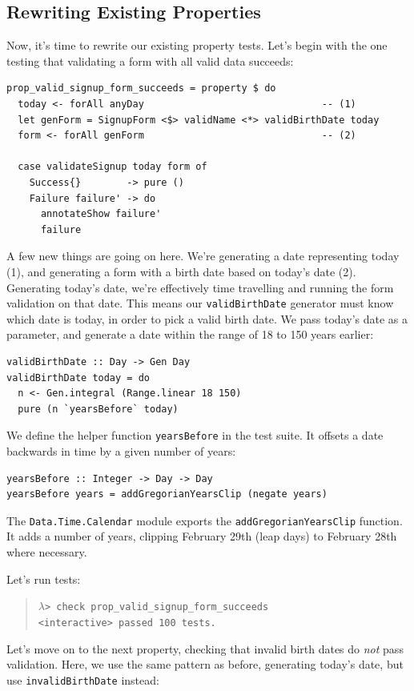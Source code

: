 \subsection{Rewriting Existing
Properties}\label{rewriting-existing-properties}

Now, it's time to rewrite our existing property tests. Let's begin with
the one testing that validating a form with all valid data succeeds:

\begin{verbatim}
prop_valid_signup_form_succeeds = property $ do
  today <- forAll anyDay                               -- (1)
  let genForm = SignupForm <$> validName <*> validBirthDate today
  form <- forAll genForm                               -- (2)

  case validateSignup today form of
    Success{}        -> pure ()
    Failure failure' -> do
      annotateShow failure'
      failure
\end{verbatim}
A few new things are going on here. We're generating a date representing
today (1), and generating a form with a birth date based on today's date
(2). Generating today's date, we're effectively time travelling and
running the form validation on that date. This means our
\texttt{validBirthDate} generator must know which date is today, in
order to pick a valid birth date. We pass today's date as a parameter,
and generate a date within the range of 18 to 150 years earlier:

\begin{verbatim}
validBirthDate :: Day -> Gen Day
validBirthDate today = do
  n <- Gen.integral (Range.linear 18 150)
  pure (n `yearsBefore` today)
\end{verbatim}
We define the helper function \texttt{yearsBefore} in the test suite. It
offsets a date backwards in time by a given number of years:

\begin{verbatim}
yearsBefore :: Integer -> Day -> Day
yearsBefore years = addGregorianYearsClip (negate years)
\end{verbatim}
The \texttt{Data.Time.Calendar} module exports the
\texttt{addGregorianYearsClip} function. It adds a number of years,
clipping February 29th (leap days) to February 28th where necessary.

Let's run tests:

\begin{quote}
$\lambda$\verb|> check prop_valid_signup_form_succeeds| \\
  \hspace*{1cm}\checkmark \verb|<interactive> passed 100 tests.|
\end{quote}
Let's move on to the next property, checking that invalid birth dates do
\emph{not} pass validation. Here, we use the same pattern as before,
generating today's date, but use \texttt{invalidBirthDate} instead:

